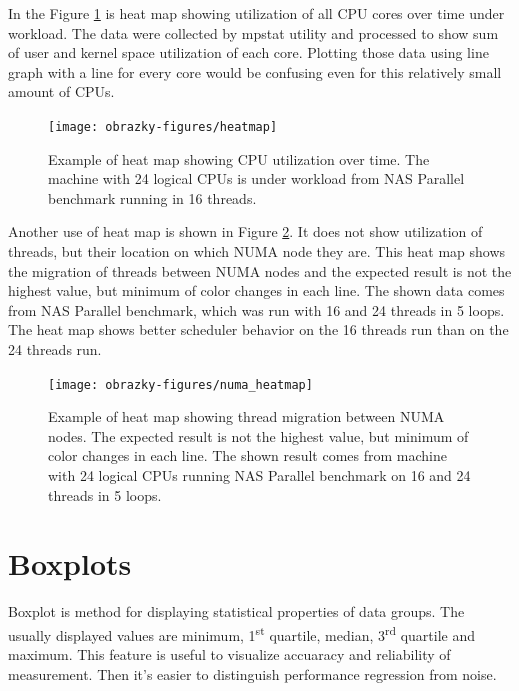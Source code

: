In the Figure \ref{fig:heatmap} is heat map showing utilization of all CPU cores over
time under workload. The data were collected by mpstat utility and processed to
show sum of user and kernel space utilization of each core. Plotting those data
using line graph with a line for every core would be confusing even for this
relatively small amount of CPUs.

\begin{figure}
  \centering
  \texttt{[image: obrazky-figures/heatmap]}
  \caption{Example of heat map showing CPU utilization over time. The machine
    with 24 logical CPUs is under workload from NAS Parallel benchmark running
    in 16 threads.}
  \label{fig:heatmap}
\end{figure}

Another use of heat map is shown in Figure \ref{fig:numa_heatmap}. It does not
show utilization of threads, but their location on which NUMA node they are.
This heat map shows the migration of threads between NUMA nodes and the expected
result is not the highest value, but minimum of color changes in each line. The
shown data comes from NAS Parallel benchmark, which was run with 16 and 24
threads in 5 loops. The heat map shows better scheduler behavior on the 16
threads run than on the 24 threads run.

\begin{figure}
  \centering
  \texttt{[image: obrazky-figures/numa\_heatmap]}
  \caption{Example of heat map showing thread migration between NUMA nodes. The
    expected result is not the highest value, but minimum of color changes in
    each line. The shown result comes from machine with 24 logical CPUs running
    NAS Parallel benchmark on 16 and 24 threads in 5 loops.}
  \label{fig:numa_heatmap}
\end{figure}

\section{Boxplots}
Boxplot is method for displaying statistical properties of data groups. The
usually displayed values are minimum, 1\textsuperscript{st} quartile, median,
3\textsuperscript{rd} quartile and maximum.
This feature is useful to visualize accuaracy and reliability of measurement.
Then it's easier to distinguish performance regression from noise.

